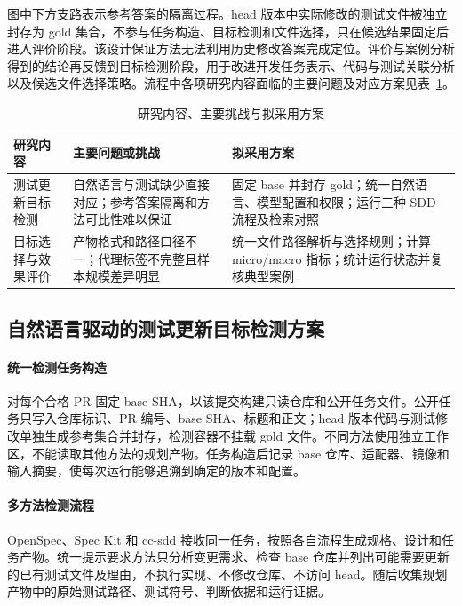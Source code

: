 图中下方支路表示参考答案的隔离过程。head 版本中实际修改的测试文件被独立封存为 gold 集合，不参与任务构造、目标检测和文件选择，只在候选结果固定后进入评价阶段。该设计保证方法无法利用历史修改答案完成定位。评价与案例分析得到的结论再反馈到目标检测阶段，用于改进开发任务表示、代码与测试关联分析以及候选文件选择策略。流程中各项研究内容面临的主要问题及对应方案见表~\ref{tab:research-plan-map}。

\begin{table}[htbp]
  \centering
  \caption{研究内容、主要挑战与拟采用方案}
  \label{tab:research-plan-map}
  \small
  \begin{tabular}{p{2.5cm}p{4.3cm}p{6.2cm}}
    \hline
    研究内容 & 主要问题或挑战 & 拟采用方案 \\
    \hline
    测试更新目标检测 & 自然语言与测试缺少直接对应；参考答案隔离和方法可比性难以保证 & 固定 base 并封存 gold；统一自然语言、模型配置和权限；运行三种 SDD 流程及检索对照 \\
    目标选择与效果评价 & 产物格式和路径口径不一；代理标签不完整且样本规模差异明显 & 统一文件路径解析与选择规则；计算 micro/macro 指标；统计运行状态并复核典型案例 \\
    \hline
  \end{tabular}
\end{table}

\subsection{自然语言驱动的测试更新目标检测方案}
\label{sec:plan-detect-module}

\paragraph{统一检测任务构造}

对每个合格 PR 固定 base SHA，以该提交构建只读仓库和公开任务文件。公开任务只写入仓库标识、PR 编号、base SHA、标题和正文；head 版本代码与测试修改单独生成参考集合并封存，检测容器不挂载 gold 文件。不同方法使用独立工作区，不能读取其他方法的规划产物。任务构造后记录 base 仓库、适配器、镜像和输入摘要，使每次运行能够追溯到确定的版本和配置。

\paragraph{多方法检测流程}

OpenSpec、Spec Kit 和 cc-sdd 接收同一任务，按照各自流程生成规格、设计和任务产物。统一提示要求方法只分析变更需求、检查 base 仓库并列出可能需要更新的已有测试文件及理由，不执行实现、不修改仓库、不访问 head。随后收集规划产物中的原始测试路径、测试符号、判断依据和运行证据。

